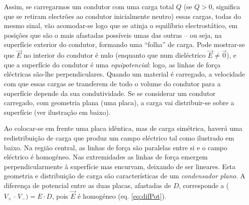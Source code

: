 \documentclass[a4paper,twoside,11pt]{report}      %
\begin{document}
Assim, se carregarmos um condutor com uma carga total $Q$ (se $Q > 0$, significa que se retiram electrões ao condutor inicialmente neutro) essas cargas, todas do mesmo sinal, vão
acomodar-se logo que se atinja o equilíbrio electrostático, em posições que são o mais afastadas possíveis umas das outras -- ou seja, na superfície exterior do condutor, formando uma ``folha'' de carga. Pode mostrar-se que $\vec{E}$ no interior do condutor é nulo (enquanto que num
dieléctrico $\vec{E} \ne \vec{0}$), e que a superfície do condutor é uma \emph{equipotencial}: logo, as linhas de força eléctricas são-lhe perpendiculares. Quando um material é carregado, a velocidade com que essas cargas se transferem de todo o volume do condutor para a superfície depende da sua condutividade. Se se considerar um condutor carregado, com geometria plana (uma placa), a carga vai distribuir-se sobre a superfície (ver ilustração em baixo).
\setlength{\unitlength}{0.8cm} 
\begin{center}
\end{center}
Ao colocar-se em frente uma placa idêntica, mas de carga simétrica, haverá uma redistribuição de carga que produz um campo eléctrico tal como ilustrado em baixo. Na região central, as linhas de força são paralelas entre si e o campo eléctrico é homogéneo. Nas extremidades as linhas de força emergem perpendicularmente à superfície mas encurvam, deixando de ser lineares. Esta geometria e distribuição de carga são características de um \emph{condensador plano}. A diferença de potencial entre as duas placas, afastadas de $D$, corresponde a ($V_+ \,–\, V_-) = E\cdot D$, pois $\vec{E}$ é homogéneo (eq. \ref{eq:difPot}).\\
\setlength{\unitlength}{1.0cm} 
\begin{center}
\end{center}
\end{document}

